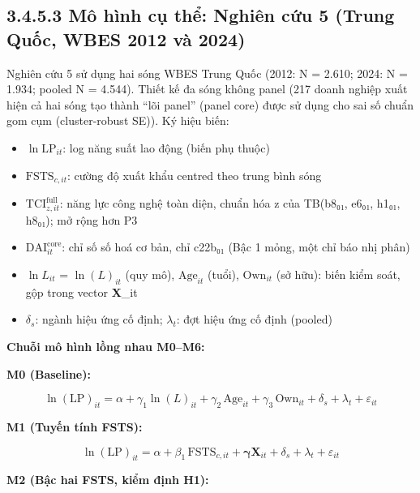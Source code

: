 \documentclass[
  a4paper,
  13pt]{extreport}
\providecommand{\tightlist}{%
  \setlength{\itemsep}{0pt}\setlength{\parskip}{0pt}}
\begin{document}
\hypertarget{muxf4-huxecnh-cux1ee5-thux1ec3-nghiuxean-cux1ee9u-5-trung-quux1ed1c-wbes-2012-vuxe0-2024}{%
\subsection{3.4.5.3 Mô hình cụ thể: Nghiên cứu 5 (Trung Quốc, WBES 2012
và
2024)}\label{muxf4-huxecnh-cux1ee5-thux1ec3-nghiuxean-cux1ee9u-5-trung-quux1ed1c-wbes-2012-vuxe0-2024}}

Nghiên cứu 5 sử dụng hai sóng WBES Trung Quốc (2012: N = 2.610; 2024: N
= 1.934; pooled N = 4.544). Thiết kế đa sóng không panel (217 doanh
nghiệp xuất hiện cả hai sóng tạo thành ``lõi panel'' (panel core) được
sử dụng cho sai số chuẩn gom cụm (cluster-robust SE)). Ký hiệu biến:

\begin{itemize}
\tightlist
\item
  \textbf{\(\ln\mathrm{LP}_{it}\)}: log năng suất lao động (biến phụ
  thuộc)
\item
  \textbf{\(\mathrm{FSTS}_{c,it}\)}: cường độ xuất khẩu centred theo
  trung bình sóng
\item
  \textbf{\(\mathrm{TCI}^{\mathrm{full}}_{z,it}\)}: năng lực công nghệ
  toàn diện, chuẩn hóa z của TB(b8₀₁, e6₀₁, h1₀₁, h8₀₁); mở rộng hơn P3
\item
  \textbf{\(\mathrm{DAI}^{\mathrm{core}}_{it}\)}: chỉ số số hoá cơ bản,
  chỉ c22b₀₁ (Bậc 1 mỏng, một chỉ báo nhị phân)
\item
  \textbf{\(\ln L_{it}\)} = \(\ln(L)_{it}\) (quy mô),
  \textbf{\(\mathrm{Age}_{it}\)} (tuổi), \textbf{\(\mathrm{Own}_{it}\)}
  (sở hữu): biến kiểm soát, gộp trong vector \textbf{X}\_it
\item
  \textbf{\(\delta_s\)}: ngành hiệu ứng cố định; \textbf{\(\lambda_t\)}:
  đợt hiệu ứng cố định (pooled)
\end{itemize}

\textbf{Chuỗi mô hình lồng nhau M0--M6:}

\textbf{M0 (Baseline):}

\[\ln(\mathrm{LP})_{it} = \alpha + \gamma_1 \ln(L)_{it} + \gamma_2\,\mathrm{Age}_{it} + \gamma_3\,\mathrm{Own}_{it} + \delta_s + \lambda_t + \varepsilon_{it}\]

\textbf{M1 (Tuyến tính FSTS):}

\[\ln(\mathrm{LP})_{it} = \alpha + \beta_1\,\mathrm{FSTS}_{c,it} + \boldsymbol{\gamma}\mathbf{X}_{it} + \delta_s + \lambda_t + \varepsilon_{it}\]

\textbf{M2 (Bậc hai FSTS, kiểm định H1):}
\end{document}
